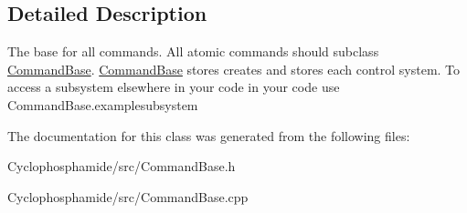 \subsection{Detailed Description}
The base for all commands. All atomic commands should subclass \hyperlink{class_command_base}{Command\+Base}. \hyperlink{class_command_base}{Command\+Base} stores creates and stores each control system. To access a subsystem elsewhere in your code in your code use Command\+Base.\+examplesubsystem 

The documentation for this class was generated from the following files\+:\begin{DoxyCompactItemize}
\item 
Cyclophosphamide/src/Command\+Base.\+h\item 
Cyclophosphamide/src/Command\+Base.\+cpp\end{DoxyCompactItemize}
